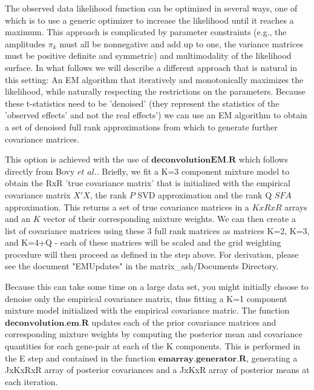 \documentclass[10pt]{article}
\newcommand{\etal}{\textit{et al.}} %
\begin{document}
The observed data likelihood function can be optimized in several ways, one of which is to use a generic optimizer to increase the likelihood until it reaches a maximum. This approach is complicated by parameter constraints (e.g., the amplitudes $\pi_{k}$ must all be nonnegative and add up to one, the variance matrices must be positive definite and symmetric) and multimodality of the likelihood surface. In what follows we will describe a different approach that is natural in this setting: An EM algorithm that iteratively and monotonically maximizes the likelihood, while naturally respecting the restrictions on the parameters.
Because these t-statistics need to be 'denoised' (they represent the statistics of the 'observed effects' and not the real effects') we can use an EM algorithm to obtain a set of denoised full rank approximations from which to generate further covariance matrices. 

This option is achieved with the use of $\textbf{deconvolutionEM.R}$ which follows directly from Bovy $\etal$. Briefly, we fit a K=3 component mixture model to obtain the RxR 'true covariance matrix' that is initialized with the empirical covariance matrix $X'X$, the rank $P$ SVD approximation and the rank Q $SFA$ approximation. This returns a set of true covariance matrices in a $KxRxR$ arrays and an $K$ vector of their corresponding mixture weights. We can then create a list of covariance matrices using these 3 full rank matrices as matrices K=2, K=3, and K=4+Q - each of these matrices will be scaled and the grid weighting procedure will then proceed as defined in the step above. For derivation, please see the document "EMUpdates" in the matrix_ash/Documents Directory.

Because this can take some time on a large data set, you might initially choose to denoise only the empirical covariance matrix, thus fitting a K=1 component mixture model initialized with the empirical covariance matric. The function $\textbf{deconvolution.em.R}$ updates each of the prior covariance matrices and corresponding mixture weights by computing the posterior mean and covariance quantities for each gene-pair at each of the K components. This is performed in the E step and contained in the function $\textbf{emarray.generator.R}$, generating a JxKxRxR array of posterior covariances and a JxKxR array of posterior means at each iteration.
\end{document}
